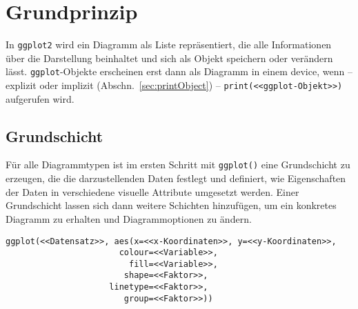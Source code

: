 \section{Grundprinzip}

In \lstinline!ggplot2! wird ein Diagramm als Liste repräsentiert, die alle Informationen über die Darstellung beinhaltet und sich als Objekt speichern oder verändern lässt. \lstinline!ggplot!-Objekte erscheinen erst dann als Diagramm in einem device, wenn -- explizit oder implizit (Abschn.\ \ref{sec:printObject}) -- \lstinline!print(<<ggplot-Objekt>>)! aufgerufen wird.

\subsection{Grundschicht}

Für alle Diagrammtypen ist im ersten Schritt mit \lstinline!ggplot()! eine Grundschicht zu erzeugen, die die darzustellenden Daten festlegt und definiert, wie Eigenschaften der Daten in verschiedene visuelle Attribute umgesetzt werden. Einer Grundschicht lassen sich dann weitere Schichten hinzufügen, um ein konkretes Diagramm zu erhalten und Diagrammoptionen zu ändern.%
\begin{lstlisting}
ggplot(<<Datensatz>>, aes(x=<<x-Koordinaten>>, y=<<y-Koordinaten>>,
                       colour=<<Variable>>,
                         fill=<<Variable>>,
                        shape=<<Faktor>>,
                     linetype=<<Faktor>>,
                        group=<<Faktor>>))
\end{lstlisting}

